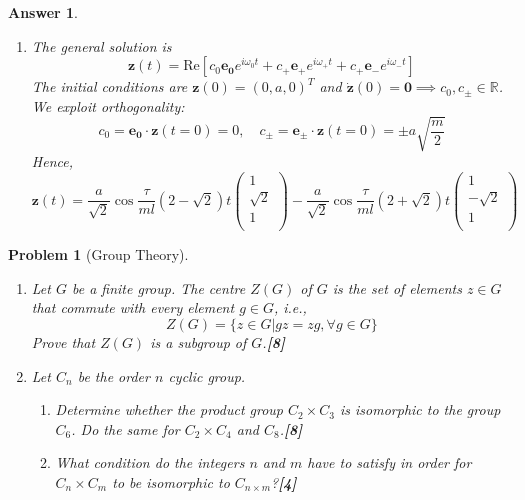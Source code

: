 \documentclass[a4paper]{article}
\newtheorem{ans}{Answer}[section]
\theoremstyle{new}
\newtheorem{qns}{Problem}[section]
\begin{document}
\begin{ans}
\begin{enumerate}[label=(\roman*)]
\begin{align}
\end{align}
The solutions are $\omega_0^2=\frac{2\tau}{ml}$, $\omega_\pm^2=\frac{\tau}{ml}(2\pm\sqrt{2})$ with their corresponding normalized eigenvectors $\mathbf{e_0}=\frac{1}{\sqrt{2m}}(1,0,-1)^T$ and $\mathbf{e_\pm}=\frac{1}{2\sqrt{m}}(1,\mp\sqrt{2},1)^T$. For the mode with frequency $\omega_0$, the centre mass is stationary and the outer masses are in anti-phase (one up, one down). For the mode with frequency $\omega_\pm$, the outer masses are in phase, with the centre mass either in-phase or anti-phase, with a relative amplitude of $\sqrt{2}$.
\item The general solution is
$$\mathbf{z}(t)=\text{Re}[c_0\mathbf{e_0}e^{i\omega_0t}+c_+\mathbf{e_+}e^{i\omega_+t}+c_+\mathbf{e_-}e^{i\omega_-t}]$$
The initial conditions are $\mathbf{z}(0)=(0,a,0)^T$ and $\mathbf{\dot{z}}(0)=\boldsymbol{0}\implies c_0,c_\pm\in\mathbb{R}$. We exploit orthogonality:
$$c_0=\mathbf{e_0}\cdot\mathbf{z}(t=0)=0,\quad c_\pm=\mathbf{e_\pm}\cdot\mathbf{z}(t=0)=\pm a\sqrt{\frac{m}{2}}$$
Hence,
$$\mathbf{z}(t)=\frac{a}{\sqrt{2}}\cos\frac{\tau}{ml}(2-\sqrt{2})t\begin{pmatrix}1\\\sqrt{2}\\1\\\end{pmatrix}-\frac{a}{\sqrt{2}}\cos\frac{\tau}{ml}(2+\sqrt{2})t\begin{pmatrix}1\\-\sqrt{2}\\1\\\end{pmatrix}$$
\end{enumerate}
\end{ans}
\begin{qns}[Group Theory]\leavevmode
\begin{enumerate}[label=(\roman*)]
\item Let $G$ be a finite group. The centre $Z(G)$ of $G$ is the set of elements $z\in G$ that commute with every element $g\in G$, i.e.,
$$Z(G) = \{z \in G| gz = zg, \forall g \in G\}$$
Prove that $Z(G)$ is a subgroup of $G$.\hfill\textbf{[8]}
\item Let $C_n$ be the order $n$ cyclic group.
\begin{enumerate}[label=(\alph*)]
\item Determine whether the product group $C_2 \times C_3$ is isomorphic to the group $C_6$. Do the same for $C_2 \times C_4$ and $C_8$.\hfill\textbf{[8]}
\item What condition do the integers $n$ and $m$ have to satisfy in order for $C_n\times C_m$ to be isomorphic to $C_{n\times m}$?\hfill\textbf{[4]}
\end{enumerate}
\end{enumerate}
\end{qns}
\end{document}
